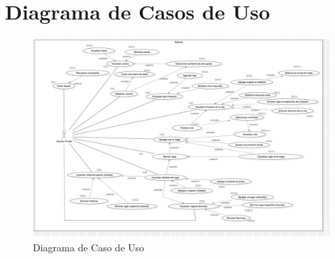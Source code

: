 \section{Diagrama de Casos de Uso}
    \begin{figure}[htbp]
        \centering
        \includegraphics[width=16.5cm]{casos de uso/caso_usoSA.jpg}
        \caption{Diagrama de Caso de Uso}
        \label{fig:enter-label}
    \end{figure}